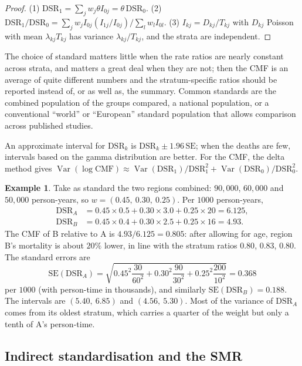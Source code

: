 \documentclass[11pt,a4paper]{article}
\numberwithin{equation}{section}
\DeclareMathOperator{\Var}{Var}
\theoremstyle{definition}
\newtheorem{exa}[thm]{Example}
\begin{document}
\begin{proof}
(1) $\text{DSR}_1 = \sum_j w_j\theta I_{0j} = \theta\,\text{DSR}_0$. (2) $\text{DSR}_1/\text{DSR}_0 = \sum_j w_j I_{0j}(I_{1j}/I_{0j})/\sum_l w_l I_{0l}$. (3) $I_{kj} = D_{kj}/T_{kj}$ with $D_{kj}$ Poisson
with mean $\lambda_{kj}T_{kj}$ has variance $\lambda_{kj}/T_{kj}$, and the strata are independent.
\end{proof}

The choice of standard matters little when the rate ratios are nearly constant across strata, and matters a great deal when they are
not; then the CMF is an average of quite different numbers and the stratum-specific ratios should be reported instead of, or as well
as, the summary. Common standards are the combined population of the groups compared, a national population, or a conventional
``world'' or ``European'' standard population that allows comparison across published studies.

An approximate interval for $\text{DSR}_k$ is $\text{DSR}_k \pm 1.96\,\text{SE}$; when the deaths are few, intervals based on the gamma distribution are
better. For the CMF, the delta method gives $\Var(\log\text{CMF}) \approx \Var(\text{DSR}_1)/\text{DSR}_1^2 + \Var(\text{DSR}_0)/\text{DSR}_0^2$.

\begin{exa}
\label{exa:dsr}
Take as standard the two regions combined: $90{,}000$, $60{,}000$ and $50{,}000$ person-years, so $w = (0.45,\ 0.30,\ 0.25)$. Per $1000$ person-years,
\begin{align*}
\text{DSR}_A &= 0.45 \times 0.5 + 0.30 \times 3.0 + 0.25 \times 20 = 6.125 , \\
\text{DSR}_B &= 0.45 \times 0.4 + 0.30 \times 2.5 + 0.25 \times 16 = 4.93 .
\end{align*}
The CMF of B relative to A is $4.93/6.125 = 0.805$: after allowing for age, region B's mortality is about $20\%$ lower, in line with the
stratum ratios $0.80$, $0.83$, $0.80$. The standard errors are
\[
\text{SE}(\text{DSR}_A) = \sqrt{0.45^2\frac{30}{60^2} + 0.30^2\frac{90}{30^2} + 0.25^2\frac{200}{10^2}} = 0.368
\]
per $1000$ (with person-time in thousands), and similarly $\text{SE}(\text{DSR}_B) = 0.188$. The intervals are $(5.40,\ 6.85)$ and $(4.56,\ 5.30)$. Most of the
variance of $\text{DSR}_A$ comes from its oldest stratum, which carries a quarter of the weight but only a tenth of A's person-time.
\end{exa}

\subsection{Indirect standardisation and the SMR}
\end{document}
